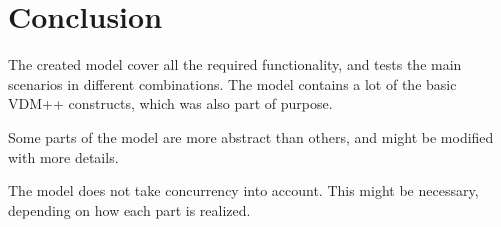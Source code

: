 \chapter{Conclusion}
The created model cover all the required functionality, and tests the main scenarios in different combinations. The model contains a lot of the basic VDM++ constructs, which was also part of purpose.
\newline

\noindent
Some parts of the model are more abstract than others, and might be modified with more details. 
\newline

\noindent
The model does not take concurrency into account. This might be necessary, depending on how each part is realized.